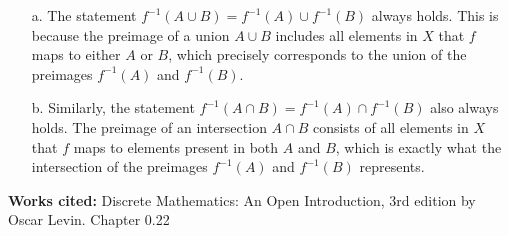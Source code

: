 \documentclass{article}
\begin{document}
\begin{enumerate}
\item[a.]
The statement \( f^{-1}(A \cup B) = f^{-1}(A) \cup f^{-1}(B) \) always holds. This is because the preimage of a union \( A \cup B \) includes all elements in \( X \) that \( f \) maps to either \( A \) or \( B \), which precisely corresponds to the union of the preimages \( f^{-1}(A) \) and \( f^{-1}(B) \).

\item[b.]
Similarly, the statement \( f^{-1}(A \cap B) = f^{-1}(A) \cap f^{-1}(B) \) also always holds. The preimage of an intersection \( A \cap B \) consists of all elements in \( X \) that \( f \) maps to elements present in both \( A \) and \( B \), which is exactly what the intersection of the preimages \( f^{-1}(A) \) and \( f^{-1}(B) \) represents.
\end{enumerate}
\vspace{0.5cm}
\textbf{Works cited:}
Discrete Mathematics: An Open Introduction, 3rd edition by Oscar Levin. Chapter 0.22
\end{document}
